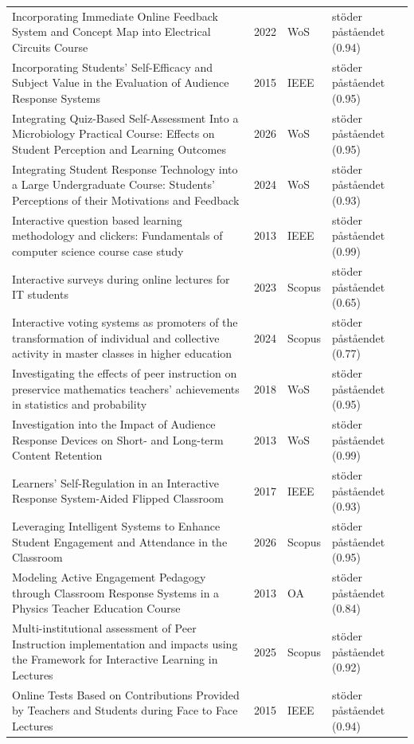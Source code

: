 \begin{longtable}{@{}%
  >{\raggedright\arraybackslash}p{}c%
  >{\raggedright\arraybackslash}p{}%
  >{\raggedright\arraybackslash}p{}@{}}
Incorporating Immediate Online Feedback System and Concept Map into Electrical Circuits Course & 2022 & WoS & stöder påståendet (0.94) \\
Incorporating Students' Self-Efficacy and Subject Value in the Evaluation of Audience Response Systems & 2015 & IEEE & stöder påståendet (0.95) \\
Integrating Quiz-Based Self-Assessment Into a Microbiology Practical Course: Effects on Student Perception and Learning Outcomes & 2026 & WoS & stöder påståendet (0.95) \\
Integrating Student Response Technology into a Large Undergraduate Course: Students' Perceptions of their Motivations and Feedback & 2024 & WoS & stöder påståendet (0.93) \\
Interactive question based learning methodology and clickers: Fundamentals of computer science course case study & 2013 & IEEE & stöder påståendet (0.99) \\
Interactive surveys during online lectures for IT students & 2023 & Scopus & stöder påståendet (0.65) \\
Interactive voting systems as promoters of the transformation of individual and collective activity in master classes in higher education & 2024 & Scopus & stöder påståendet (0.77) \\
Investigating the effects of peer instruction on preservice mathematics teachers' achievements in statistics and probability & 2018 & WoS & stöder påståendet (0.95) \\
Investigation into the Impact of Audience Response Devices on Short- and Long-term Content Retention & 2013 & WoS & stöder påståendet (0.99) \\
Learners' Self-Regulation in an Interactive Response System-Aided Flipped Classroom & 2017 & IEEE & stöder påståendet (0.93) \\
Leveraging Intelligent Systems to Enhance Student Engagement and Attendance in the Classroom & 2026 & Scopus & stöder påståendet (0.95) \\
Modeling Active Engagement Pedagogy through Classroom Response Systems in a Physics Teacher Education Course & 2013 & OA & stöder påståendet (0.84) \\
Multi-institutional assessment of Peer Instruction implementation and impacts using the Framework for Interactive Learning in Lectures & 2025 & Scopus & stöder påståendet (0.92) \\
Online Tests Based on Contributions Provided by Teachers and Students during Face to Face Lectures & 2015 & IEEE & stöder påståendet (0.94) \\

\end{longtable}
